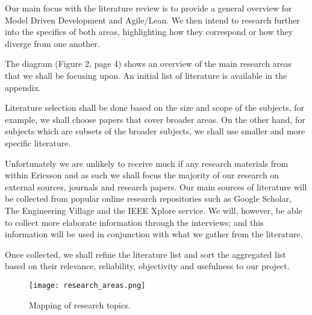 \documentclass[ProjectPlan_innit.tex]{subfiles}
\begin{document}
Our main focus with the literature review is to provide a general overview for Model Driven Development and Agile/Lean. We then intend to research further into the specifics of both areas, highlighting how they correspond or how they diverge from one another. 
\smallskip

The diagram (Figure 2, page 4) shows an overview of the main research areas that we shall be focusing upon. An initial list of literature is available in the appendix.
\smallskip

Literature selection shall be done based on the size and scope of the subjects, for example, we shall choose papers that cover broader areas. On the other hand, for subjects which are subsets of the broader subjects, we shall use smaller and more specific literature.
\smallskip

Unfortunately we are unlikely to receive much if any research materials from within Ericsson and as such we shall focus the majority of our research on external sources, journals and research papers. Our main sources of literature will be collected from popular online research repositories such as Google Scholar, The Engineering Village and the IEEE Xplore service. We will, however, be able to collect more elaborate information through the interviews; and this information will be used in conjunction with what we gather from the literature. 
\smallskip

Once collected, we shall refine the literature list and sort the aggregated list based on their relevance, reliability, objectivity and usefulness to our project. 
\smallskip

\begin{figure*}[H!]
  \texttt{[image: research\_areas.png]}
  \caption{Mapping of research topics.}
  \label{BBB}
\end{figure*}
\end{document}
